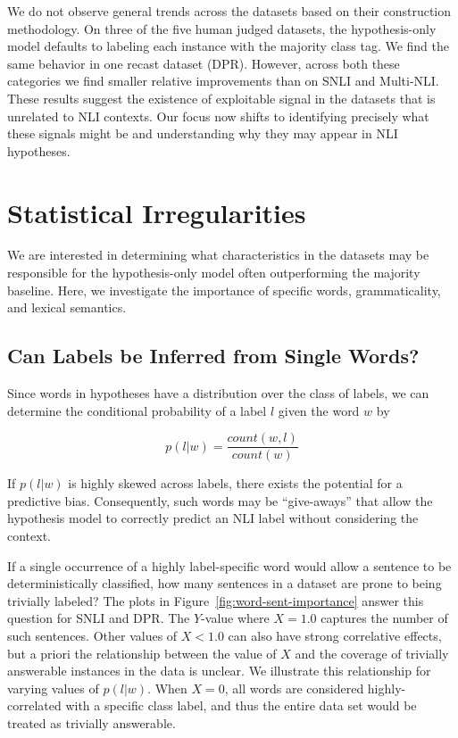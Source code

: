 We do not observe general trends across the datasets based on their construction methodology. On three of the five human judged datasets, the hypothesis-only model defaults to labeling each instance with the majority class tag.  We find the same behavior in one recast dataset (DPR).  However, across both these categories we find smaller relative improvements than on SNLI and Multi-NLI. These results suggest the existence of exploitable signal in the datasets that is unrelated to NLI contexts. Our focus now shifts to identifying precisely what these signals might be and understanding why they may appear in NLI hypotheses.

\section{Statistical Irregularities} We are interested in determining what characteristics in the datasets may be responsible for the hypothesis-only model often outperforming the majority baseline. Here, we investigate the importance of specific words,  grammaticality, and lexical semantics.

\subsection{Can Labels be Inferred from Single Words?} Since words in hypotheses have a distribution over the class of labels, we can determine the conditional probability of a label $l$ given the word $w$ by

\begin{equation}
p(l|w) = \dfrac{count(w,l)}{count(w)}
\label{eq:p-of-l-given-w}
\end{equation}

If $p(l|w)$ is highly skewed across labels, there exists the potential for a predictive bias.  Consequently, such words may be ``give-aways'' that allow the hypothesis model to correctly predict an NLI label without considering the context. 

If a single occurrence of a highly label-specific word would allow a sentence to be deterministically classified, how many sentences in a dataset are prone to being trivially labeled?  The plots in Figure~\ref{fig:word-sent-importance} answer this question for SNLI and DPR.  The $Y$-value where $X=1.0$ captures the number of such sentences.  Other values of $X<1.0$ can also have strong correlative effects, but a priori the relationship between the value of $X$ and the coverage of trivially answerable instances in the data is unclear.  We illustrate this relationship for varying values of $p(l|w)$. When $X=0$, all words are considered highly-correlated with a specific class label, and thus the entire data set would be treated as trivially answerable.

